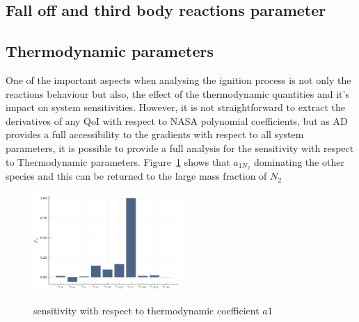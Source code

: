 \documentclass[preprint,review,12pt]{elsarticle}
\begin{document}
%
%
 

\subsection{Fall off and third body reactions parameter}

\subsection{Thermodynamic parameters}
One of the important aspects when analysing the ignition process is not only the reactions behaviour but also, the effect of the thermodynamic quantities and it's impact on system sensitivities. However, it is not straightforward to extract the derivatives of any QoI with respect to NASA polynomial coefficients, but as AD provides a full accessibility to the gradients with respect to all system parameters, it is possible to provide a full analysis for the sensitivity with respect to Thermodynamic parameters. 
Figure~\ref{fig:figure7} shows that $a_{1N_2}$ dominating the other species and this can be returned to the large mass fraction of $N_2$
\begin{figure}
\centering
 {\includegraphics[width=0.5\textwidth]{figures/a1.pdf}}
\caption{sensitivity with respect to thermodynamic coefficient $a1$}
    \label{fig:figure7}
\end{figure}
\end{document}
